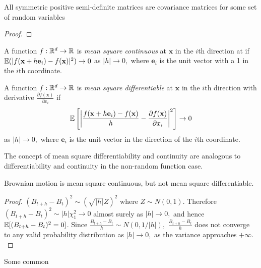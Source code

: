 \begin{theorem}
    All symmetric positive semi-definite matrices are covariance matrices for
    some set of random variables
\end{theorem}
\begin{proof}
\end{proof}

\color{black}

\begin{definition}
    A function $f:\mathbb{R}^d\to\mathbb{R}$ is \emph{mean square continuous} at $\mathbf{x}$
    in the $i$th direction at if
    $\operatorname{\mathbb{E}}(|f(\mathbf{x} + h\mathbf{e}_i) - f(\mathbf{x})|^2)\to 0$ as $|h|\to 0,$
    where $\mathbf{e}_i$ is the unit vector with a 1 in the $i$th coordinate.
\end{definition}

\begin{definition}
    A function $f:\mathbb{R}^d\to\mathbb{R}$ is \emph{mean square differentiable} at
    $\mathbf{x}$ in the $i$th direction with derivative
    $\frac{\partial f(\mathbf{x})}{\partial x_i}$ if
    $$
        \operatorname{\mathbb{E}}\left[
            \left|
            \frac{f(\mathbf{x} + h\mathbf{e}_i) - f(\mathbf{x})}{h}
            - \frac{\partial f(\mathbf{x})}{\partial x_i}
            \right|^2
            \right]\to 0
    $$ as $|h|\to 0,$ where $\mathbf{e}_i$ is the unit vector in the direction
    of the $i$th coordinate.
\end{definition}

The concept of mean square differentiability and continuity are analogous to
differentiability and continuity in the non-random function case.

\begin{theorem}
    Brownian motion is mean square continuous, but not mean square
    differentiable.
\end{theorem}
\begin{proof}
    $(B_{t + h} - B_t)^2 \sim (\sqrt{|h|}Z)^2$ where $Z\sim N(0,1).$ Therefore
    $(B_{t + h} - B_t)^2 \sim |h|\chi_1^2 \to 0$ almost surely as $|h|\to 0,$
    and hence $\operatorname{\mathbb{E}}[(B_{t + h} - B_t)^2= 0]$. Since
    $\frac{B_{t + h} - B_t}{h} \sim N(0, 1/|h|),$ $\frac{B_{t + h} - B_t}{h}$
    does not converge to any valid probability distribution as $|h| \to 0,$ as
    the variance approaches $+\infty.$
\end{proof}

Some common

